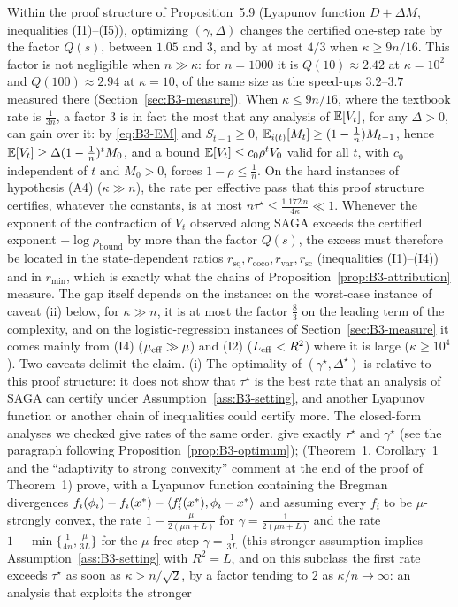 \begin{remark}\label{rem:B3-conclusion}
Within the proof structure of Proposition~5.9 (Lyapunov function $D+\Delta M$, inequalities (I1)--(I5)), optimizing $(\gamma,\Delta)$ changes the certified one-step rate by the factor $Q(s)$, between $1.05$ and $3$, and by at most $4/3$ when $\kappa\ge 9n/16$. This factor is not negligible when $n\gg\kappa$: for $n=1000$ it is $Q(10)\approx2.42$ at $\kappa=10^2$ and $Q(100)\approx2.94$ at $\kappa=10$, of the same size as the speed-ups $3.2$--$3.7$ measured there (Section~\ref{sec:B3-measure}). When $\kappa\le9n/16$, where the textbook rate is $\frac1{3n}$, a factor $3$ is in fact the most that any analysis of $\mathbb{E}[V_t]$, for any $\Delta>0$, can gain over it: by \eqref{eq:B3-EM} and $S_{t-1}\ge0$, $\mathbb{E}_{i(t)}[M_t]\ge(1-\frac1n)M_{t-1}$, hence $\mathbb{E}[V_t]\ge\Delta(1-\frac1n)^tM_0$, and a bound $\mathbb{E}[V_t]\le c_0\rho^tV_0$ valid for all $t$, with $c_0$ independent of $t$ and $M_0>0$, forces $1-\rho\le\frac1n$. On the hard instances of hypothesis (A4) ($\kappa\gg n$), the rate per effective pass that this proof structure certifies, whatever the constants, is at most $n\tau^\star\le\frac{1.172\,n}{4\kappa}\ll1$. Whenever the exponent of the contraction of $V_t$ observed along SAGA exceeds the certified exponent $-\log\rho_{\mathrm{bound}}$ by more than the factor $Q(s)$, the excess must therefore be located in the state-dependent ratios $r_{\mathrm{sq}},r_{\mathrm{coco}},r_{\mathrm{var}},r_{\mathrm{sc}}$ (inequalities (I1)--(I4)) and in $r_{\min}$, which is exactly what the chains of Proposition~\ref{prop:B3-attribution} measure. The gap itself depends on the instance: on the worst-case instance of caveat (ii) below, for $\kappa\gg n$, it is at most the factor $\frac83$ on the leading term of the complexity, and on the logistic-regression instances of Section~\ref{sec:B3-measure} it comes mainly from (I4) ($\mu_{\mathrm{eff}}\gg\mu$) and (I2) ($L_{\mathrm{eff}}<R^2$) where it is large ($\kappa\ge10^4$). Two caveats delimit the claim. (i) The optimality of $(\gamma^\star,\Delta^\star)$ is relative to this proof structure: it does not show that $\tau^\star$ is the best rate that an analysis of SAGA can certify under Assumption~\ref{ass:B3-setting}, and another Lyapunov function or another chain of inequalities could certify more. The closed-form analyses we checked give rates of the same order. \cite{hofmann2015variance} give exactly $\tau^\star$ and $\gamma^\star$ (see the paragraph following Proposition~\ref{prop:B3-optimum}); \cite{defazio2014saga} (Theorem~1, Corollary~1 and the ``adaptivity to strong convexity'' comment at the end of the proof of Theorem~1) prove, with a Lyapunov function containing the Bregman divergences $f_i(\phi_i)-f_i(x^\ast)-\left\langle f_i'(x^\ast), \phi_i-x^\ast \right\rangle$ and assuming every $f_i$ to be $\mu$-strongly convex, the rate $1-\frac{\mu}{2(\mu n+L)}$ for $\gamma=\frac1{2(\mu n+L)}$ and the rate $1-\min\{\frac1{4n},\frac{\mu}{3L}\}$ for the $\mu$-free step $\gamma=\frac1{3L}$ (this stronger assumption implies Assumption~\ref{ass:B3-setting} with $R^2=L$, and on this subclass the first rate exceeds $\tau^\star$ as soon as $\kappa>n/\sqrt2$, by a factor tending to $2$ as $\kappa/n\to\infty$: an analysis that exploits the stronger 
\end{remark}
